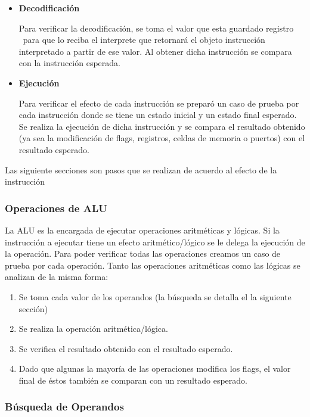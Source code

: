 \begin{enumerate}
\begin{itemize}
\item \textbf{Decodificación}

Para verificar la decodificación, se toma el valor que esta guardado registro \IR\ para que lo reciba el interprete que retornará el objeto instrucción interpretado a partir de ese valor. Al obtener dicha instrucción se compara con la instrucción esperada.
 
\item \textbf{Ejecución}

Para verificar el efecto de cada instrucción se preparó un caso de prueba por cada instrucción donde se tiene un estado inicial y un estado final esperado. Se realiza la ejecución de dicha instrucción y se compara el resultado obtenido (ya sea la modificación de flags, registros, celdas de memoria o puertos) con el resultado esperado. 

\end{itemize}

Las siguiente secciones son pasos que se realizan de acuerdo al efecto de la instrucción
  
\subsubsection{Operaciones de ALU}

La ALU es la encargada de ejecutar operaciones aritméticas y lógicas. Si la instrucción a ejecutar tiene un efecto aritmético/lógico se le delega la ejecución de la operación. Para poder verificar todas las operaciones creamos un caso de prueba por cada operación. Tanto las operaciones aritméticas como las lógicas se analizan de la misma forma:

\begin{enumerate}
\item Se toma cada valor de los operandos (la búsqueda se detalla el la siguiente sección)

\item Se realiza la operación aritmética/lógica. 

\item Se verifica el resultado obtenido con el resultado esperado.

\item Dado que algunas la mayoría de las operaciones modifica los flags, el valor final de éstos también se comparan con un resultado esperado. 
\end{enumerate}

\subsubsection{Búsqueda de Operandos}


\end{enumerate}

